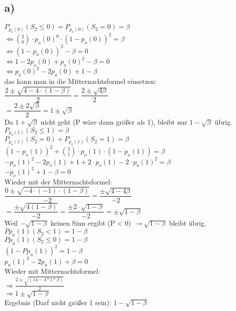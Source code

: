 \documentclass{article}
\begin{document}
			\subsection*{a)}
				$P_{p_o(0)}(S_2 \leq 0) = P_{p_o(0)}(S_2 = 0) = \beta$\\[1em]
				$\Leftrightarrow \binom{2}{0} \cdot p_o(0)^0 \cdot (1-p_o(0))^2 = \beta$\\[1em]
				$\Leftrightarrow (1-p_o(0))^2 - \beta = 0$\\[1em]
				$\Leftrightarrow 1 - 2p_o(0) + p_o(0)^2 - \beta = 0$\\[1em]
				$\Leftrightarrow p_o(0)^2 - 2p_o(0) + 1 - \beta$\\[1em]
				das kann man in die Mitternachtsformel einsetzen:\\[1em]
				$\dfrac{2 \pm \sqrt{4 - 4 \cdot (1 - \beta)}}{2} = \dfrac{2 \pm \sqrt{4\beta}}{2}$\\[1em]
				$= \dfrac{2 \pm 2\sqrt{\beta}}{2} = 1 \pm \sqrt{\beta}$\\ [1em]
				Da $1 + \sqrt{\beta}$ nicht geht (P wäre dann größer als 1), bleibt nur $1 - \sqrt{\beta}$ übrig.\\[2em]
				
				$P_{p_o(1)}(S_2 \leq 1) = \beta$\\[1em]
				$P_{p_o(1)}(S_2 = 0) + P_{p_o(1)}(S_2 = 1) = \beta$\\[1em]
				$(1 - p_o(1))^2 + \binom{2}{1} \cdot p_o(1) \cdot (1 - p_o(1)) = \beta$\\[1em]
				$-p_o(1)^2 - 2p_o(1) + 1 + 2\cdot p_o(1) - 2\cdot p_o(1)^2 = \beta$\\[1em]
				$-p_o(1)^2 + 1 - \beta = 0$\\[1em]
				Wieder mit der Mitternachtsformel:\\[1em]
				$\dfrac{0 \pm\sqrt{-4 \cdot (-1) \cdot (1-\beta)}}{-2} =\dfrac{\pm \sqrt{4-4\beta}}{-2}$\\[1em]
				$= \dfrac{\pm \sqrt{4(1-\beta)}}{-2} = \dfrac{\pm 2 \cdot \sqrt{1 - \beta}}{-2} = \pm \sqrt{1-\beta}$\\
				Weil $-\sqrt{1-\beta}$ keinen Sinn ergibt (P < 0) $\rightarrow \sqrt{1-\beta}$ bleibt übrig.\\[2em]
				
				\pagebreak
				$P{p_u(1)}(S_2<1) = 1-\beta$\\[1em]
				$P{p_u(1)}(S_2\leq 0) = 1-\beta$\\[1em]
				$(1-P{p_u(1)})^2= 1-\beta$\\[1em]
				$p_u(1)^2 - 2p_u(1) +\beta= 0$\\[1em]
				Wieder mit Mitternachtsformel:\\[1em]
				$\Rightarrow \frac{2\pm\sqrt{(14-4*1*\beta)}}{2}$\\[1em]
				$\Rightarrow 1\pm \sqrt{1-\beta}$\\[1em]
				Ergebnis (Darf nicht größer 1 sein): $1- \sqrt{1-\beta}$\\[2em]
				
\end{document}

